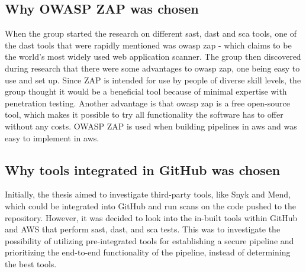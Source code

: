 \subsection{Why OWASP ZAP was chosen}
When the group started the research on different \acrshort{sast}, \acrshort{dast} and \acrshort{sca} tools, one of the \acrshort{dast} tools that were rapidly mentioned was \acrshort{owasp} \acrshort{zap} - which claims to be the world's most widely used web application scanner. 
The group then discovered during research that there were some advantages to \acrshort{owasp} \acrshort{zap}, one being easy to use and set up. Since ZAP is intended for use by people of diverse skill levels, the group thought it would be a beneficial tool because of minimal expertise with penetration testing. Another advantage is that \acrshort{owasp} \acrshort{zap} is a free open-source tool, which makes it possible to try all functionality the software has to offer without any costs. OWASP ZAP is used when building \gls{pipeline}s in \acrshort{aws} and was easy to implement in \acrshort{aws}.

\subsection{Why tools integrated in GitHub was chosen}
Initially, the thesis aimed to investigate third-party tools, like Snyk and Mend, which could be integrated into GitHub and run scans on the code pushed to the repository. However, it was decided to look into the in-built tools within GitHub and AWS that perform \acrshort{sast}, \acrshort{dast}, and \acrshort{sca} tests. This was to investigate the possibility of utilizing pre-integrated tools for establishing a secure pipeline and prioritizing the end-to-end functionality of the pipeline, instead of determining the best tools.

